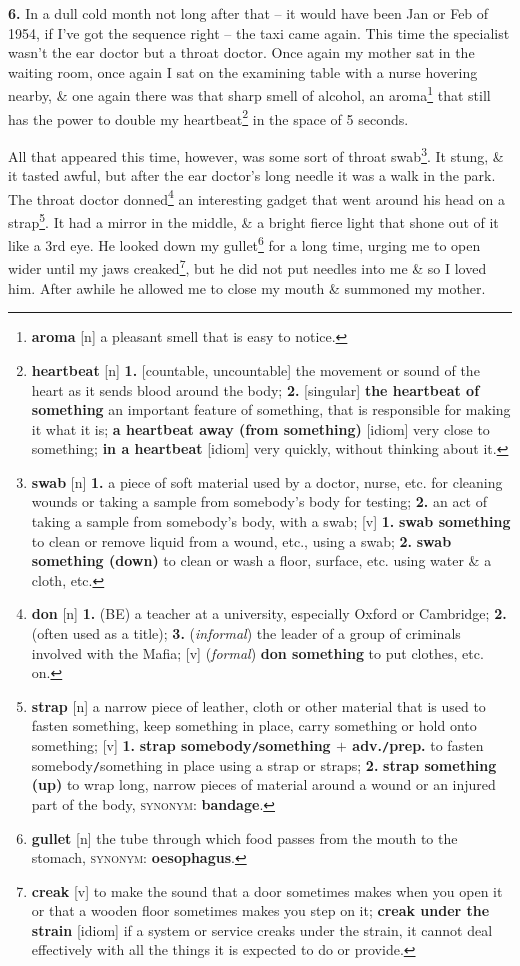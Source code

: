 \documentclass[oneside]{book}
\numberwithin{equation}{section}
\begin{document}
\textbf{6.} In a dull cold month not long after that -- it would have been Jan or Feb of 1954, if I've got the sequence right -- the taxi came again. This time the specialist wasn't the ear doctor but a throat doctor. Once again my mother sat in the waiting room, once again I sat on the examining table with a nurse hovering nearby, \& one again there was that sharp smell of alcohol, an aroma\footnote{\textbf{aroma} [n] a pleasant smell that is easy to notice.} that still has the power to double my heartbeat\footnote{\textbf{heartbeat} [n] \textbf{1.} [countable, uncountable] the movement or sound of the heart as it sends blood around the body; \textbf{2.} [singular] \textbf{the heartbeat of something} an important feature of something, that is responsible for making it what it is; \textbf{a heartbeat away (from something)} [idiom] very close to something; \textbf{in a heartbeat} [idiom] very quickly, without thinking about it.} in the space of 5 seconds.

All that appeared this time, however, was some sort of throat swab\footnote{\textbf{swab} [n] \textbf{1.} a piece of soft material used by a doctor, nurse, etc. for cleaning wounds or taking a sample from somebody's body for testing; \textbf{2.} an act of taking a sample from somebody's body, with a swab; [v] \textbf{1.} \textbf{swab something} to clean or remove liquid from a wound, etc., using a swab; \textbf{2.} \textbf{swab something (down)} to clean or wash a floor, surface, etc. using water \& a cloth, etc.}. It stung, \& it tasted awful, but after the ear doctor's long needle it was a walk in the park. The throat doctor donned\footnote{\textbf{don} [n] \textbf{1.} (BE) a teacher at a university, especially Oxford or Cambridge; \textbf{2.} (often used as a title); \textbf{3.} (\textit{informal}) the leader of a group of criminals involved with the Mafia; [v] (\textit{formal}) \textbf{don something} to put clothes, etc. on.} an interesting gadget that went around his head on a strap\footnote{\textbf{strap} [n] a narrow piece of leather, cloth or other material that is used to fasten something, keep something in place, carry something or hold onto something; [v] \textbf{1.} \textbf{strap somebody\texttt{/}something $+$ adv.\texttt{/}prep.} to fasten somebody\texttt{/}something in place using a strap or straps; \textbf{2.} \textbf{strap something (up)} to wrap long, narrow pieces of material around a wound or an injured part of the body, \textsc{synonym}: \textbf{bandage}.}. It had a mirror in the middle, \& a bright fierce light that shone out of it like a 3rd eye. He looked down my gullet\footnote{\textbf{gullet} [n] the tube through which food passes from the mouth to the stomach, \textsc{synonym}: \textbf{oesophagus}.} for a long time, urging me to open wider until my jaws creaked\footnote{\textbf{creak} [v] to make the sound that a door sometimes makes when you open it or that a wooden floor sometimes makes you step on it; \textbf{creak under the strain} [idiom] if a system or service creaks under the strain, it cannot deal effectively with all the things it is expected to do or provide.}, but he did not put needles into me \& so I loved him. After awhile he allowed me to close my mouth \& summoned my mother.
\end{document}
